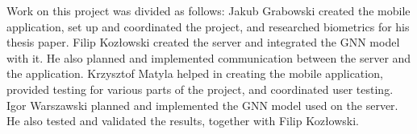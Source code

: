 Work on this project was divided as follows:
Jakub Grabowski created the mobile application, set up and coordinated the project, and researched biometrics for his thesis paper.
Filip Kozłowski created the server and integrated the GNN model with it. He also planned and implemented communication between the server and the application.
Krzysztof Matyla helped in creating the mobile application, provided testing for various parts of the project, and coordinated user testing.
Igor Warszawski planned and implemented the GNN model used on the server. He also tested and validated the results, together with Filip Kozłowski.